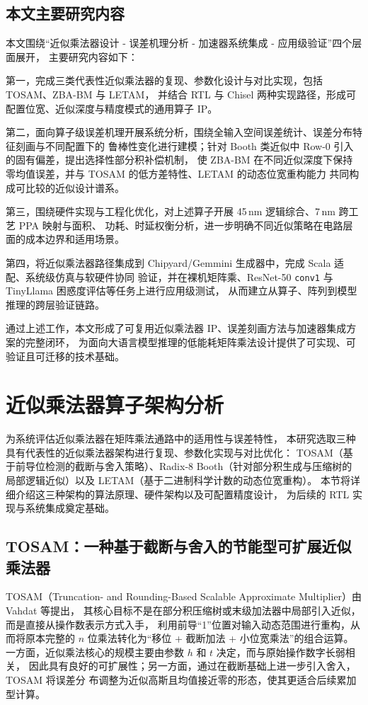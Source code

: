 \documentclass[12pt,a4paper,UTF8]{article}
\begin{document}
\subsection{本文主要研究内容}
本文围绕“近似乘法器设计 - 误差机理分析 - 加速器系统集成 - 应用级验证”四个层面展开，
主要研究内容如下：

第一，完成三类代表性近似乘法器的复现、参数化设计与对比实现，包括 TOSAM、ZBA-BM 与 LETAM，
并结合 RTL 与 Chisel 两种实现路径，形成可配置位宽、近似深度与精度模式的通用算子 IP。

第二，面向算子级误差机理开展系统分析，围绕全输入空间误差统计、误差分布特征刻画与不同配置下的
鲁棒性变化进行建模；针对 Booth 类近似中 Row-0 引入的固有偏差，提出选择性部分积补偿机制，
使 ZBA-BM 在不同近似深度下保持零均值误差，并与 TOSAM 的低方差特性、LETAM 的动态位宽重构能力
共同构成可比较的近似设计谱系。

第三，围绕硬件实现与工程化优化，对上述算子开展 45\,nm 逻辑综合、7\,nm 跨工艺 PPA 映射与面积、
功耗、时延权衡分析，进一步明确不同近似策略在电路层面的成本边界和适用场景。

第四，将近似乘法器路径集成到 Chipyard/Gemmini 生成器中，完成 Scala 适配、系统级仿真与软硬件协同
验证，并在裸机矩阵乘、ResNet-50 \texttt{conv1} 与 TinyLlama 困惑度评估等任务上进行应用级测试，
从而建立从算子、阵列到模型推理的跨层验证链路。

通过上述工作，本文形成了可复用近似乘法器 IP、误差刻画方法与加速器集成方案的完整闭环，
为面向大语言模型推理的低能耗矩阵乘法设计提供了可实现、可验证且可迁移的技术基础。

\clearpage
\section{近似乘法器算子架构分析}

为系统评估近似乘法器在矩阵乘法通路中的适用性与误差特性，
本研究选取三种具有代表性的近似乘法器架构进行复现、参数化实现与对比优化：
TOSAM（基于前导位检测的截断与舍入策略）、Radix‑8 Booth（针对部分积生成与压缩树的
局部逻辑近似）以及 LETAM（基于二进制科学计数的动态位宽重构）。
本节将详细介绍这三种架构的算法原理、硬件架构以及可配置精度设计，
为后续的 RTL 实现与系统集成奠定基础。

\subsection{TOSAM：一种基于截断与舍入的节能型可扩展近似乘法器}
TOSAM（Truncation- and Rounding-Based Scalable Approximate Multiplier）由 Vahdat 等提出，
其核心目标不是在部分积压缩树或末级加法器中局部引入近似，而是直接从操作数表示方式入手，
利用前导“1”位置对输入动态范围进行重构，从而将原本完整的 $n$ 位乘法转化为“移位 + 截断加法 + 
小位宽乘法”的组合运算\cite{vahdat2019tosam}。
一方面，近似乘法核心的规模主要由参数 $h$ 和 $t$ 决定，而与原始操作数字长弱相关，
因此具有良好的可扩展性；另一方面，通过在截断基础上进一步引入舍入，TOSAM 将误差分
布调整为近似高斯且均值接近零的形态，使其更适合后续累加型计算。
\end{document}

